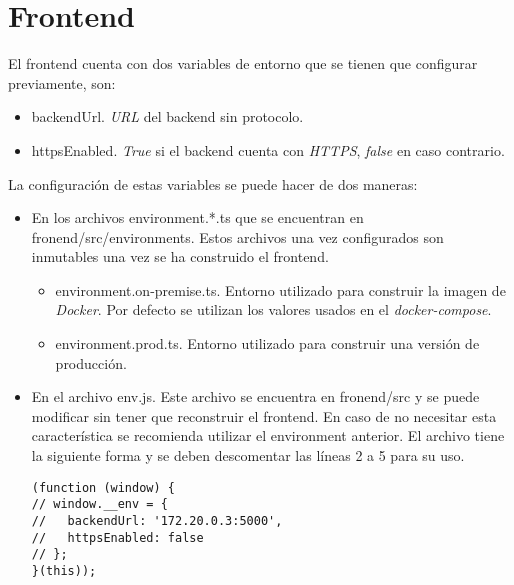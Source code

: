 \section{Frontend}

El frontend cuenta con dos variables de entorno que se tienen que configurar previamente, son:

\begin{itemize}
	\item \textsf{backendUrl}. \textit{URL} del backend sin protocolo.
	\item \textsf{httpsEnabled}. \textit{True} si el backend cuenta con \textit{HTTPS}, \textit{false} en caso contrario.
\end{itemize}

La configuración de estas variables se puede hacer de dos maneras:

\begin{itemize}
	\item En los archivos \textsf{environment.*.ts} que se encuentran en \textsf{fronend/src/environments}. Estos archivos una vez configurados son inmutables una vez se ha construido el frontend.

	\begin{itemize}
		\item \textsf{environment.on-premise.ts}. Entorno utilizado para construir la imagen de \textit{Docker}. Por defecto se utilizan los valores usados en el \textit{docker-compose}.
		\item \textsf{environment.prod.ts}. Entorno utilizado para construir una versión de producción.
	\end{itemize}

	\item En el archivo \textsf{env.js}. Este archivo se encuentra en \textsf{fronend/src} y se puede modificar sin tener que reconstruir el frontend. En caso de no necesitar esta característica se recomienda utilizar el environment anterior. El archivo tiene la siguiente forma y se deben descomentar las líneas 2 a 5 para su uso.
	
\begin{lstlisting}
(function (window) {
// window.__env = {
//   backendUrl: '172.20.0.3:5000',
//   httpsEnabled: false
// };
}(this));
\end{lstlisting}
\end{itemize}
